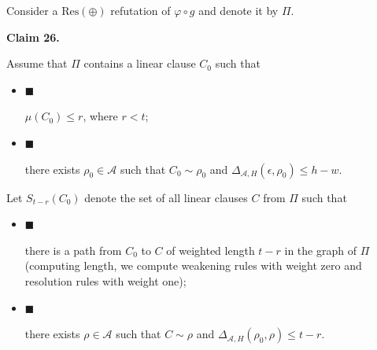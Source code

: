 Consider a $\mathrm{Res}(\oplus)$ refutation of $\varphi\circ g$ and denote it by $\Pi$.\par



\par\medskip\noindent\textbf{
Claim 26. 
}\par



Assume that $\Pi$ contains a linear clause $C_{0}$ such that\par


\begin{itemize}


\item 
$\blacksquare$ 


$\mu(C_{0})\leq r$, where $r<t$;\par





\item 
$\blacksquare$ 


there exists $\rho_{0}\in\mathcal{A}$ such that $C_{0}\sim\rho_{0}$ and $\Delta_{\mathcal{A},H}(\epsilon,\rho_{0})\leq h-w$.\par





\end{itemize}


Let $S_{t-r}(C_{0})$ denote the set of all linear clauses $C$ from $\Pi$ such that\par


\begin{itemize}


\item 
$\blacksquare$ 


there is a path from $C_{0}$ to $C$ of weighted length $t-r$ in the graph of $\Pi$
(computing length, we compute weakening rules with weight zero and resolution rules with weight one);\par





\item 
$\blacksquare$ 


there exists $\rho\in\mathcal{A}$ such that $C\sim\rho$ and $\Delta_{\mathcal{A},H}(\rho_{0},\rho)\leq t-r$.\par





\end{itemize}




